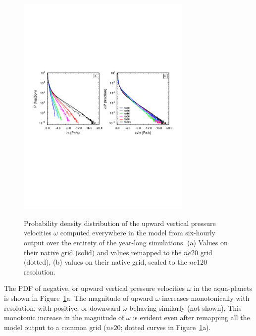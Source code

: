 \documentclass[times]{qjrms4}
\begin{document}
\begin{figure}
\begin{center}
\noindent\includegraphics[width=20pc,angle=0]{figs/temp_2pdf.pdf}\\
\end{center}
\caption{Probability density distribution of the upward vertical pressure velocities $\omega$ computed everywhere in the model from six-hourly output over the entirety of the year-long simulations. (a) Values on their native grid (solid) and values remapped to the $ne20$ grid (dotted), (b) values on their native grid, scaled to the $ne120$ resolution.}
\label{fig:2pdf}
\end{figure}

The PDF of negative, or upward vertical pressure velocities $\omega$ in the aqua-planets is shown in Figure~\ref{fig:2pdf}a. The magnitude of upward $\omega$ increases monotonically with resolution, with positive, or downward $\omega$ behaving similarly (not shown). This monotonic increase in the magnitude of $\omega$ is evident even after remapping all the model output to a common grid ($ne20$; dotted curves in Figure~\ref{fig:2pdf}a).
\end{document}
